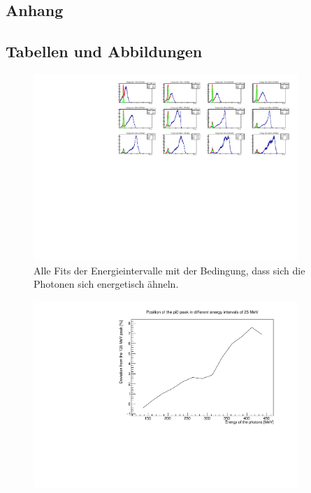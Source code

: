 \documentclass[a4paper,11pt,oneside,final,german,openbib,pdftex]{scrbook}
\begin{document}
\begin{appendix}
\chapter{Anhang}

\section{Tabellen und Abbildungen}


\begin{figure}[h!]
	\begin{center}
		\includegraphics[width=100mm]{RealDataEnergyIntervalSymmetricPhotonsAllFits}
		\caption{Alle Fits der Energieintervalle mit der Bedingung, dass sich die Photonen sich energetisch ähneln.}
		\label{fig:similarenergyallfits}
	\end{center}
\end{figure}




\begin{figure}[h!]
	\begin{center}
		\includegraphics[width=100mm]{RealDataEnergyIntervalSymmetricPhotonsRelativeDeviation}
		

\end{center}
\end{figure}
\end{appendix}
\end{document}
